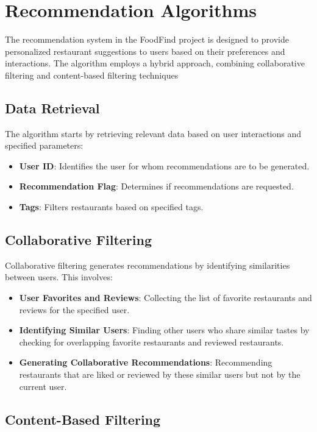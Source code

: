 \documentclass[12pt, a4paper, oneside]{article}
\begin{document}
\section{Recommendation Algorithms}
The recommendation system in the FoodFind project is designed to provide personalized restaurant suggestions to users based on their preferences and interactions. The algorithm employs a hybrid approach, combining collaborative filtering and content-based filtering techniques
\subsection{Data Retrieval}

The algorithm starts by retrieving relevant data based on user interactions and specified parameters:
\begin{itemize}
    \item \textbf{User ID}: Identifies the user for whom recommendations are to be generated.
    \item \textbf{Recommendation Flag}: Determines if recommendations are requested.
    \item \textbf{Tags}: Filters restaurants based on specified tags.
\end{itemize}

\subsection{Collaborative Filtering}

Collaborative filtering generates recommendations by identifying similarities between users. This involves:
\begin{itemize}
    \item \textbf{User Favorites and Reviews}: Collecting the list of favorite restaurants and reviews for the specified user.
    \item \textbf{Identifying Similar Users}: Finding other users who share similar tastes by checking for overlapping favorite restaurants and reviewed restaurants.
    \item \textbf{Generating Collaborative Recommendations}: Recommending restaurants that are liked or reviewed by these similar users but not by the current user.
\end{itemize}

\subsection{Content-Based Filtering}
\end{document}
